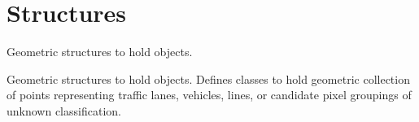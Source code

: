 \hypertarget{group___structures}{
\section{\-Structures}
\label{group___structures}
}


\-Geometric structures to hold objects.  


\-Geometric structures to hold objects. \-Defines classes to hold geometric collection of points representing traffic lanes, vehicles, lines, or candidate pixel groupings of unknown classification. 